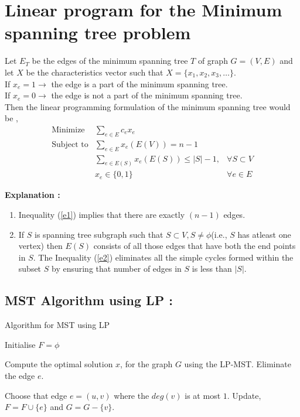 \documentclass[12pt]{article}
\theoremstyle{plain}
\begin{document}
\section*{Linear program for the Minimum spanning tree problem}
Let $E_T$ be the edges of the minimum spanning tree $T$ of  graph $G=(V,E)$ and let $X$ be the characteristics vector such that $X=\{ x_1,x_2,x_3,\ldots\}$.\\
If ${x_e= 1 \rightarrow}$ the edge is a part of the minimum spanning tree. \\
If ${x_e= 0 \rightarrow}$ the edge is not a part of the minimum spanning tree.\\
Then the linear programming formulation of the minimum spanning tree would be ,
 \begin{align}
\mbox{Minimize}  & \sum_{e \in E} c_e x_e & \nonumber \\ 
\mbox{Subject to} & \sum_{e \in E}  x_e(E(V))=n-1 &  \label{e1}\\
& \sum_{e \in E(S)}  x_e(E(S)) \leq |S|-1, & \forall S \subset V \label{e2}\\
& x_e \in \{0,1\} & \forall e \in E
 \end{align}

\textbf{Explanation :}

\begin{enumerate}
\item Inequality (\ref{e1}) implies that there are exactly $(n-1)$ edges.
\item  If $S$ is spanning tree subgraph such that  $S \subset V, S\neq \phi$(i.e., $S$ has atleast one 
vertex) then $E(S)$ consists of all those edges that have both the end points in $S$. The Inequality 
(\ref{e2}) eliminates all the simple cycles formed within the subset $S$ by ensuring that number of edges in 
$S$ is less than $|S|$.
\end{enumerate}

\subsection*{MST Algorithm using LP :}


\begin{minipage}{1.\linewidth}
\begin{algorithm2e}[H]
\caption{Algorithm for MST using LP}
\label{alg:MST-LP}

Initialise $F= \phi$\;  \vspace{.1cm}

{
Compute the optimal solution $x$, for the graph $G$ using the LP-MST.\; \vspace{.1cm}
{Eliminate  the edge $e$.}


\Else
{
Choose that edge $e=(u,v)$ where the $deg(v)$ is at most $1$.\; \vspace{.1cm}
Update,$F=F \cup \{e\}$ and $G=G- \{v\}$.
}
}

\end{algorithm2e}
\end{minipage}
\end{document}
